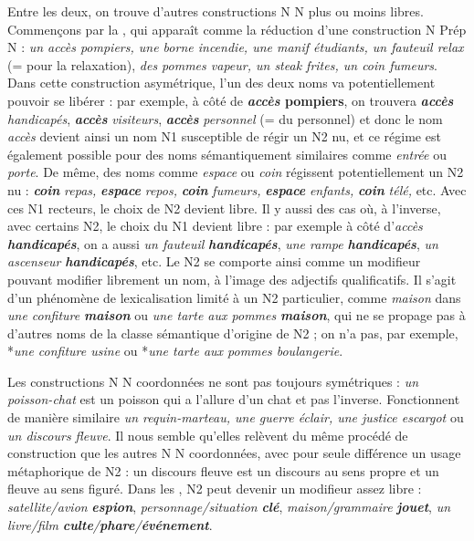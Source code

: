 {    Entre les deux, on trouve d’autres constructions N N plus ou moins libres. Commençons par la  , qui apparaît comme la réduction d’une construction N Prép N : \textit{un accès pompiers, une borne incendie, une manif étudiants, un fauteuil relax} (= pour la relaxation), \textit{des pommes vapeur, un steak frites, un coin fumeurs}. Dans cette construction asymétrique, l’un des deux noms va potentiellement pouvoir se libérer : par exemple, à côté de \textbf{\textit{accès}  pompiers}, on trouvera \textbf{\textit{accès}} \textit{handicapés}, \textbf{\textit{accès}} \textit{visiteurs}, \textbf{\textit{accès}} \textit{personnel} (= du personnel) et donc le nom \textit{accès} devient ainsi un nom N1 susceptible de régir un N2 nu, et ce régime est également possible pour des noms sémantiquement similaires comme \textit{entrée} ou \textit{porte}. De même, des noms comme \textit{espace} ou \textit{coin} régissent potentiellement un N2 nu : \textbf{\textit{coin}} \textit{repas,} \textbf{\textit{espace}} \textit{repos,} \textbf{\textit{coin}} \textit{fumeurs,} \textbf{\textit{espace}} \textit{enfants,} \textbf{\textit{coin}} \textit{télé,} etc. Avec ces N1 recteurs, le choix de N2 devient libre. 
    Il y aussi des cas où, à l'inverse, avec certains N2, le choix du N1 devient libre : par exemple à côté d’\textit{accès} \textbf{\textit{handicapés}}, on a aussi \textit{un fauteuil} \textbf{\textit{handicapés}}, \textit{une rampe} \textbf{\textit{handicapés}}, \textit{un ascenseur} \textbf{\textit{handicapés}}, etc. Le N2 se comporte ainsi comme un modifieur pouvant modifier librement un nom, à l'image des adjectifs qualificatifs. Il s'agit d'un phénomène de lexicalisation limité à un N2 particulier, comme \textit{maison} dans \textit{une confiture} \textbf{\textit{maison}} ou \textit{une tarte aux pommes} \textbf{\textit{maison}}, qui ne se propage pas à d'autres noms de la classe sémantique d'origine de N2 ; on n’a pas, par exemple, *\textit{une confiture usine} ou *\textit{une tarte aux pommes boulangerie}.

    Les constructions N N coordonnées ne sont pas toujours symétriques : \textit{un poisson-chat} est un poisson qui a l’allure d’un chat et pas l’inverse. Fonctionnent de manière similaire \textit{un requin-marteau, une guerre éclair, une justice escargot} ou \textit{un discours fleuve}. Il nous semble qu’elles relèvent du même procédé de construction que les autres N N coordonnées, avec pour seule différence un usage métaphorique de N2 : un discours fleuve est un discours au sens propre et un fleuve au sens figuré. Dans les  , N2 peut devenir un modifieur assez libre : \textit{satellite/avion} \textbf{\textit{espion}}, \textit{personnage/situation} \textbf{\textit{clé}}, \textit{maison/grammaire} \textbf{\textit{jouet}}, \textit{un livre/film} \textbf{\textit{culte}}\textit{/}\textbf{\textit{phare}}\textit{/}\textbf{\textit{événement}}.

}
